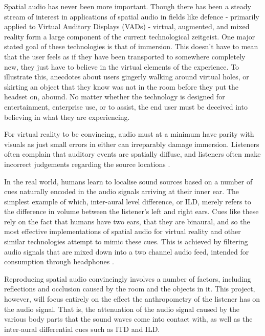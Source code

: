 Spatial audio has never been more important. Though there has been a steady stream of interest in applications of spatial audio in fields like defence - primarily applied to Virtual Auditory Displays (VADs)\citep{bronkhorst} - virtual, augmented, and mixed reality form a large component of the current technological zeitgeist. One major stated goal of these technologies is that of immersion. This doesn't have to mean that the user feels as if they have been transported to somewhere completely new, they just have to believe in the virtual elements of the experience. To illustrate this, anecdotes about users gingerly walking around virtual holes, or skirting an object that they know was not in the room before they put the headset on, abound. No matter whether the technology is designed for entertainment, enterprise use, or to assist, the end user must be deceived into believing in what they are experiencing. 

For virtual reality to be convincing, audio must at a minimum have parity with visuals as just small errors in either can irreparably damage immersion. Listeners often complain that auditory events are spatially diffuse, and listeners often make incorrect judgements regarding the source locations \citep{wenzel1}.

In the real world, humans learn to localise sound sources based on a number of cues naturally encoded in the audio signals arriving at their inner ear. The simplest example of which, inter-aural level difference, or ILD, merely refers to the difference in volume between the listener's left and right ears. Cues like these rely on the fact that humans have two ears, that they are binaural, and so the most effective implementations of spatial audio for virtual reality and other similar technologies attempt to mimic these cues. This is achieved by filtering audio signals that are mixed down into a two channel audio feed, intended for consumption through headphones \citep{Algazi2011}.

Reproducing spatial audio convincingly involves a number of factors, including reflections and occlusion caused by the room and the objects in it. This project, however, will focus entirely on the effect the anthropometry of the listener has on the audio signal. That is, the attenuation of the audio signal caused by the various body parts that the sound waves come into contact with, as well as the inter-aural differential cues such as ITD and ILD.

